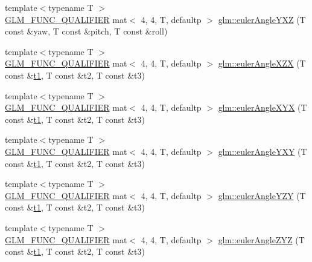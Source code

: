 \begin{DoxyCompactItemize}
\item 
{\footnotesize template$<$typename T $>$ }\\\hyperlink{setup_8hpp_a33fdea6f91c5f834105f7415e2a64407}{G\+L\+M\+\_\+\+F\+U\+N\+C\+\_\+\+Q\+U\+A\+L\+I\+F\+I\+ER} mat$<$ 4, 4, T, defaultp $>$ \hyperlink{group__gtx__euler__angles_gab8ba99a9814f6d9edf417b6c6d5b0c10}{glm\+::euler\+Angle\+Y\+XZ} (T const \&yaw, T const \&pitch, T const \&roll)
\item 
{\footnotesize template$<$typename T $>$ }\\\hyperlink{setup_8hpp_a33fdea6f91c5f834105f7415e2a64407}{G\+L\+M\+\_\+\+F\+U\+N\+C\+\_\+\+Q\+U\+A\+L\+I\+F\+I\+ER} mat$<$ 4, 4, T, defaultp $>$ \hyperlink{group__gtx__euler__angles_ga60171c79a17aec85d7891ae1d1533ec9}{glm\+::euler\+Angle\+X\+ZX} (T const \&\hyperlink{_s_d_l__opengl__glext_8h_af48031a37b713afa3b0d0d7d29653d7c}{t1}, T const \&t2, T const \&t3)
\item 
{\footnotesize template$<$typename T $>$ }\\\hyperlink{setup_8hpp_a33fdea6f91c5f834105f7415e2a64407}{G\+L\+M\+\_\+\+F\+U\+N\+C\+\_\+\+Q\+U\+A\+L\+I\+F\+I\+ER} mat$<$ 4, 4, T, defaultp $>$ \hyperlink{group__gtx__euler__angles_ga29bd0787a28a6648159c0d6e69706066}{glm\+::euler\+Angle\+X\+YX} (T const \&\hyperlink{_s_d_l__opengl__glext_8h_af48031a37b713afa3b0d0d7d29653d7c}{t1}, T const \&t2, T const \&t3)
\item 
{\footnotesize template$<$typename T $>$ }\\\hyperlink{setup_8hpp_a33fdea6f91c5f834105f7415e2a64407}{G\+L\+M\+\_\+\+F\+U\+N\+C\+\_\+\+Q\+U\+A\+L\+I\+F\+I\+ER} mat$<$ 4, 4, T, defaultp $>$ \hyperlink{group__gtx__euler__angles_ga750fba9894117f87bcc529d7349d11de}{glm\+::euler\+Angle\+Y\+XY} (T const \&\hyperlink{_s_d_l__opengl__glext_8h_af48031a37b713afa3b0d0d7d29653d7c}{t1}, T const \&t2, T const \&t3)
\item 
{\footnotesize template$<$typename T $>$ }\\\hyperlink{setup_8hpp_a33fdea6f91c5f834105f7415e2a64407}{G\+L\+M\+\_\+\+F\+U\+N\+C\+\_\+\+Q\+U\+A\+L\+I\+F\+I\+ER} mat$<$ 4, 4, T, defaultp $>$ \hyperlink{group__gtx__euler__angles_ga5e5e40abc27630749b42b3327c76d6e4}{glm\+::euler\+Angle\+Y\+ZY} (T const \&\hyperlink{_s_d_l__opengl__glext_8h_af48031a37b713afa3b0d0d7d29653d7c}{t1}, T const \&t2, T const \&t3)
\item 
{\footnotesize template$<$typename T $>$ }\\\hyperlink{setup_8hpp_a33fdea6f91c5f834105f7415e2a64407}{G\+L\+M\+\_\+\+F\+U\+N\+C\+\_\+\+Q\+U\+A\+L\+I\+F\+I\+ER} mat$<$ 4, 4, T, defaultp $>$ \hyperlink{group__gtx__euler__angles_gacd795f1dbecaf74974f9c76bbcca6830}{glm\+::euler\+Angle\+Z\+YZ} (T const \&\hyperlink{_s_d_l__opengl__glext_8h_af48031a37b713afa3b0d0d7d29653d7c}{t1}, T const \&t2, T const \&t3)

\end{DoxyCompactItemize}
